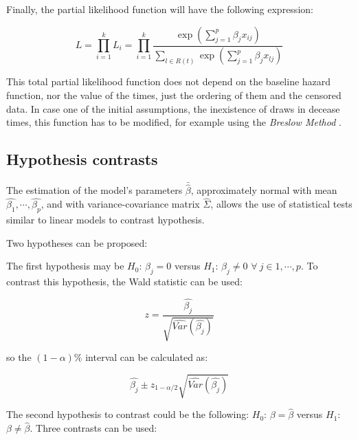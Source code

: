 \documentclass[11pt]{book} %
\begin{document}
      Finally, the partial likelihood function will have the following expression:

      \begin{equation}
        L = \prod_{i=1}^k L_i= \prod_{i=1}^k \frac{\exp\left(\sum_{j=1}^p\beta_jx_{ij}\right)}{\sum_{l\in R(t)}\exp\left(\sum_{j=1}^p\beta_jx_{lj}\right)}
        \label{eq:cox-total-partial-likelihood-function}
      \end{equation}

      This total partial likelihood function does not depend on the baseline hazard function, nor the value of the times, just the ordering of them and the censored data. In case one of the initial assumptions, the inexistence of draws in decease times, this function has to be modified, for example using the \emph{Breslow Method} \cite{breslow-method}.

    \subsection{Hypothesis contrasts}

      The estimation of the model's parameters $\bar{\hat{\beta}}$, approximately normal with mean ${\hat{\beta_1},\cdots,\hat{\beta_p}}$, and with variance-covariance matrix $\hat{\Sigma}$, allows the use of statistical tests similar to linear models to contrast hypothesis.

      Two hypotheses can be proposed:

      The first hypothesis may be $H_0$: $\beta_j=0$ versus $H_1$: $\beta_j\neq0$ $\forall \ j \in {1,\cdots,p}$. To contrast this hypothesis, the Wald statistic can be used:

      \begin{equation}
        z=\frac{\hat{\beta_j}}{\sqrt{\hat{Var}(\hat{\beta_j})}}
        \label{eq:cox-hyp-contrast-1-wald}
      \end{equation}

      so the $(1-\alpha)\%$ interval can be calculated as:

      \begin{equation}
        \hat{\beta_j}\pm z_{1-\alpha/2}\sqrt{\hat{Var}(\hat{\beta_j})}
        \label{eq:cox-hyp-contrast-1-wald-interval}
      \end{equation}

      The second hypothesis to contrast could be the following: $H_0$: $\beta=\hat{\beta}$ versus $H_1$: $\beta\neq\hat{\beta}$. Three contrasts can be used:
\end{document}

